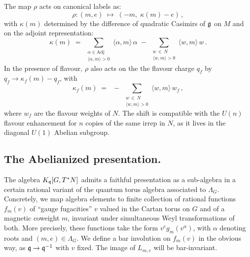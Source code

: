 \documentclass[12pt]{amsart}
\begin{document}
The map $\rho$ acts on canonical labels as: 
\begin{equation}\label{eq:rho-witten}
	\rho : (m,e) \;\longmapsto\; (-m,\; \kappa(m)-e) \,,
\end{equation}
with $\kappa(m)$ determined by the difference of quadratic Casimirs of $\mathfrak{g}$ on $M$ and on the adjoint
representation:
\begin{equation}
\kappa(m) \;=\;
\sum_{\substack{\alpha \in \mathrm{Adj} \\ \langle \alpha,m\rangle > 0}}
   \langle \alpha,m\rangle\,\alpha
\;-\;
\sum_{\substack{w \,\in\, N \\ \langle w,m\rangle > 0}}
   \langle w,m\rangle\, w \, .
\end{equation}
In the presence of flavour, $\rho$ also acts on the the flavour charge $q_f$ by $q_f \to \kappa_f(m)-q_f$, with
\begin{equation}
\kappa_f(m) \;=\; \;-\;
\sum_{\substack{w \,\in\, N \\ \langle w,m\rangle > 0}}
   \langle w,m\rangle\, w_f\, ,
\end{equation}
where $w_f$ are the flavour weights of $N$. The shift is compatible with the $U(n)$ flavour enhancement for $n$ copies of the same irrep in $N$,
as it lives in the diagonal $U(1)$ Abelian subgroup. 
 
 \subsection{The Abelianized presentation.}
The algebra $K_{\mathfrak{q}}[G,T^*N]$ admits a faithful presentation as a sub-algebra in a certain rational variant of the quantum torus algebra \cite{Alday:2009fs,Drukker:2009id,Gomis:2009xg,Gomis:2010kv,Gomis:2011pf,Ito:2011ea,Gang:2012yr,Bullimore:2015lsa,Dedushenko:2018icp,Braverman:2016wma,Braverman:2016pwk,Finkelberg:2017qpy,Schrader:2019hzd,Cautis:2023jkq} associated to $\Lambda_G$. Concretely, we map algebra elements to finite collection of rational functions $f_m(v)$ of ``gauge fugacities'' $v$ valued in the Cartan torus on $G$ and of a magnetic coweight $m$, invariant under simultaneous Weyl transformations of both. More precisely, these functions take the form $v^e g_m(v^\alpha)$, with $\alpha$ denoting roots and $(m,e) \in \Lambda_G$. We define a bar involution on $f_m(v)$ in the obvious way, as $\mathfrak{q} \to \mathfrak{q}^{-1}$ with $v$ fixed. The image of $L_{m,e}$ will be bar-invariant.
\end{document}
